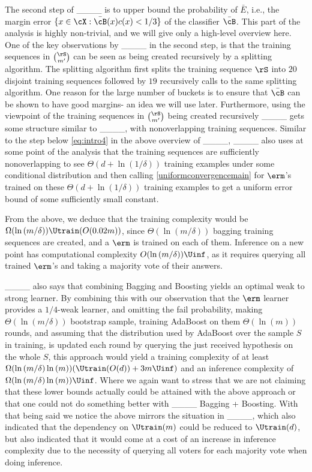 The second step of ____ is to upper bound the probability of $\bar{E}$, i.e., the margin error $\{ x\in \cX: \bar{\cB}(x)c(x)< 1/3\}$ of the classifier $\bar{\cB}$. This part of the analysis is highly non-trivial, and we will give only a high-level overview here. One of the key observations by ____ in the second step, is that the training sequences in $ \binom{\rS}{m'} $ can be seen as being created recursively by a splitting algorithm. The splitting algorithm first splits the training sequence $\rS$ into $20$ disjoint training sequences followed by $19$ recursively calls to the same splitting algorithm. 
One reason for the large number of buckets is to ensure that $\bar{\cB}$ can be shown to have good margins- an idea we will use later. Furthermore, using the viewpoint of the training sequences in $ \binom{\rS}{m'} $ being created recursively ____ gets some structure similar to ____, with nonoverlapping training sequences. Similar to the step below \cref{eq:intro4} in the above overview of ____, ____ also uses at some point of the analysis that the training sequences are sufficiently nonoverlapping to see $\Theta(d+\ln{\left(1/\delta \right)})$ training examples under some conditional distribution and then calling \cref{uniformconvergencemain} for $\erm$'s trained on these $\Theta(d+\ln{\left(1/\delta \right)})$ training examples to get a uniform error bound of some sufficiently small constant. 

From the above, we deduce that the training complexity would be $\Omega(\ln{\left(m/\delta \right)})\Utrain(O(0.02m))$, since $\Theta(\ln{\left(m/\delta \right)})$ bagging training sequences are created, and a $\erm$ is trained on each of them. Inference on a new point has computational complexity $O(\ln{\left(m/\delta \right)})\Uinf$, as it requires querying all trained $ \erm $'s and taking a majority vote of their answers.

____ also says that combining Bagging and Boosting yields an optimal weak to strong learner. By combining this with our observation that the $ \erm $ learner provides a $ 1/4 $-weak learner, and omitting the fail probability, making $ \Theta(\ln{(m/\delta )} )$ bootstrap sample, training AdaBoost on them  $ \Theta(\ln{(m )}) $ rounds, and assuming that the distribution used by AdaBoost over the sample $ S $ in training, is updated each round by querying the just received hypothesis on the whole $ S $, this approach would yield a training complexity of at least $\Omega(\ln{\left(m/\delta \right)}\ln{\left( m\right)})(\Utrain(O(d))+3m\Uinf)$ and an inference complexity of $\Omega(\ln{\left(m/\delta \right)}\ln{\left(m \right)})\Uinf$. Where we again want to stress that we are not claiming that these lower bounds actually could be attained with the above approach or that one could not do something better with ____ Bagging + Boosting.
With that being said we notice the above mirrors the situation in ____, which also indicated that the dependency on \( \Utrain(m) \) could be reduced to \( \Utrain(d) \), but also indicated that it would come at a cost of an increase in inference complexity due to the necessity of querying all voters for each majority vote when doing inference.


